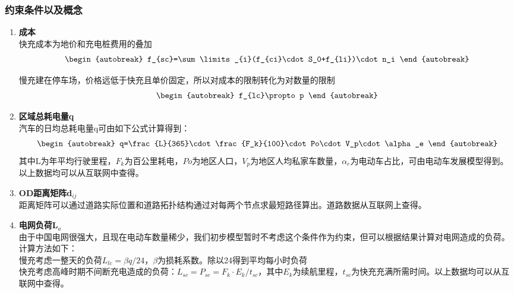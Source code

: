 \documentclass[12pt, a4paper, oneside]{ctexart}
\begin{document}
\subsubsection{约束条件以及概念}
\begin{enumerate}[label = \alph*)]
    \item \textbf{成本}\\
          快充成本为地价和充电桩费用的叠加
          \begin{align}\begin{autobreak}
                  f_{sc}=\sum\limits_{i}(f_{ci}\cdot S_0+f_{li})\cdot n_i
              \end{autobreak}\end{align}



          慢充建在停车场，价格远低于快充且单价固定，所以对成本的限制转化为对数量的限制
          \begin{align}\begin{autobreak}
                  f_{lc}\propto p
              \end{autobreak}\end{align}
    \item \textbf{区域总耗电量q}\\
          汽车的日均总耗电量q可由如下公式计算得到：
          \begin{align}\begin{autobreak}
                  q=\frac{L}{365}\cdot \frac{F_k}{100}\cdot Po\cdot V_p\cdot \alpha_e
              \end{autobreak}\end{align}
          其中L为年平均行驶里程，\(F_k\)为百公里耗电，\(Po\)为地区人口，\(V_p\)为地区人均私家车数量，\(\alpha_e\)为电动车占比，可由电动车发展模型得到。以上数据均可以从互联网中查得。
    \item \textbf{OD距离矩阵d\(_{ij}\)}\\
          距离矩阵可以通过道路实际位置和道路拓扑结构通过对每两个节点求最短路径算出。道路数据从互联网上查得。
    \item \textbf{电网负荷L\(_a\)}\\
          由于中国电网很强大，且现在电动车数量稀少，我们初步模型暂时不考虑这个条件作为约束，但可以根据结果计算对电网造成的负荷。计算方法如下：\\
          慢充考虑一整天的负荷\(L_{lc}=\beta q/24\)，\(\beta\)为损耗系数。除以24得到平均每小时负荷\\
          快充考虑高峰时期不间断充电造成的负荷：\(L_{sc}=P_{sc}=F_k\cdot E_k/t_{sc}\)，其中\(E_k\)为续航里程，\(t_{sc}\)为快充充满所需时间。以上数据均可以从互联网中查得。


\end{enumerate}
\end{document}
